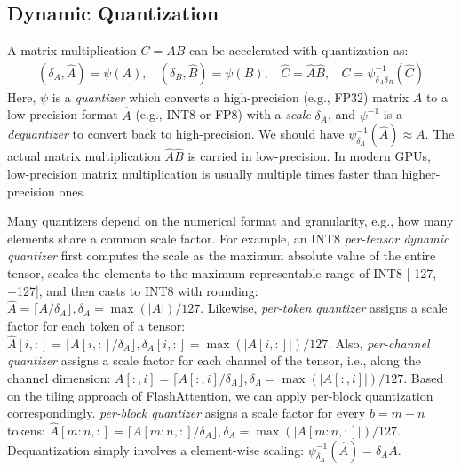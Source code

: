 \subsection{Dynamic Quantization} \label{sec:dynamic_quant}

A matrix multiplication $C=AB$ can be accelerated with quantization as:
\begin{align}
(\delta_A, \hat A) = \psi(A),~~~~(\delta_B, \hat B) = \psi(B),~~~~\hat C=\hat A\hat B,~~~~C=\psi^{-1}_{\delta_A\delta_B}(\hat C)
\end{align}
Here, $\psi$ is a \emph{quantizer} which converts a high-precision (e.g., FP32) matrix $A$ to a low-precision format $\hat A$ (e.g., INT8 or FP8) with a \emph{scale} $\delta_A$, and $\psi^{-1}$ is a \emph{dequantizer} to convert back to high-precision. We should have $\psi^{-1}_{\delta_A}(\hat A)\approx A$. The actual matrix multiplication $\hat A\hat B$ is carried in low-precision. In modern GPUs, low-precision matrix multiplication is usually multiple times faster than higher-precision ones. 

Many quantizers depend on the numerical format and granularity, e.g., how many elements share a common scale factor. For example, an INT8 \emph{per-tensor dynamic quantizer} first computes the scale as the maximum absolute value of the entire tensor, scales the elements to the maximum representable range of INT8 [-127, +127], and then casts to INT8 with rounding: $\hat A = \lceil A/\delta_A \rfloor, \delta_A=\max(|A|)/127$. 
Likewise, \emph{per-token quantizer} assigns a scale factor for each token of a tensor: $\hat A[i,:] = \lceil A[i,:]/\delta_A \rfloor, \delta_A[i,:] = \max(|A[i,:]|)/127$. 
Also, \emph{per-channel quantizer} assigns a scale factor for each channel of the tensor, i.e., along the channel dimension: $A[:, i] = \lceil A[:, i] / \delta_A \rfloor, \delta_A = \max(|A[:, i]|) / {127}$.
Based on the tiling approach of FlashAttention, we can apply per-block quantization correspondingly. \emph{per-block quantizer} asigns a scale factor for every $b=m-n$ tokens: $\hat A[m:n,:] = \lceil A[m:n,:]/\delta_A \rfloor, \delta_A = \max(|A[m:n,:]|)/127$. 
Dequantization simply involves a element-wise scaling: $\psi_{\delta_A}^{-1}(\hat A)=\delta_A \hat A$.


